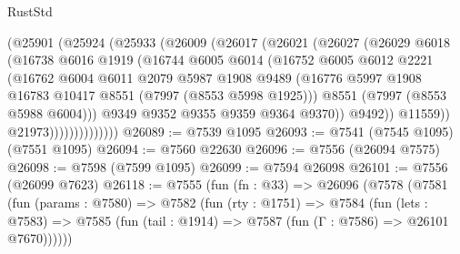 \begin{lexlean}{RustStd}
\begin{coremodule}
{\begin{coremodule}
{{{{{{{{{{{{{{{{{{{{{{{{{{{{{{{{{{{{{{{{{{{                      (@25901
                        (@25924
                          (@25933
                            (@26009
                              (@26017
                                (@26021
                                  (@26027
                                    (@26029
                                      @6018
                                      (@16738
                                        @6016
                                        @1919
                                        (@16744
                                          @6005
                                          @6014
                                          (@16752
                                            @6005
                                            @6012
                                            @2221
                                            (@16762
                                              @6004
                                              @6011
                                              @2079
                                              @5987
                                              @1908
                                              @9489
                                              (@16776
                                                @5997
                                                @1908
                                                @16783
                                                @10417
                                                @8551
                                                (@7997 (@8553 @5998 @1925)))
                                              @8551
                                              (@7997 (@8553 @5988 @6004)))
                                            @9349
                                            @9352
                                            @9355
                                            @9359
                                            @9364
                                            @9370))
                                        @9492))
                                    @11559))
                                @21973))))))))))))))
@26089 := @7539 @1095
@26093 := @7541 (@7545 @1095) (@7551 @1095)
@26094 := @7560 @22630
@26096 := @7556 (@26094 @7575)
@26098 := @7598 (@7599 @1095)
@26099 := @7594 @26098
@26101 := @7556 (@26099 @7623)
@26118 := @7555
    (fun (fn : @33) =>
    @26096
      (@7578
        (@7581
          (fun (params : @7580) =>
          @7582
            (fun (rty : @1751) =>
            @7584
              (fun (lets : @7583) =>
              @7585 (fun (tail : @1914) => @7587 (fun (Γ : @7586) => @26101 @7670))))))
}}}}}}}}}}}}}}}}}}}}}}}}}}}}}}}}}}}}}}}}}}}
\end{coremodule}}
\end{coremodule}
\end{lexlean}
